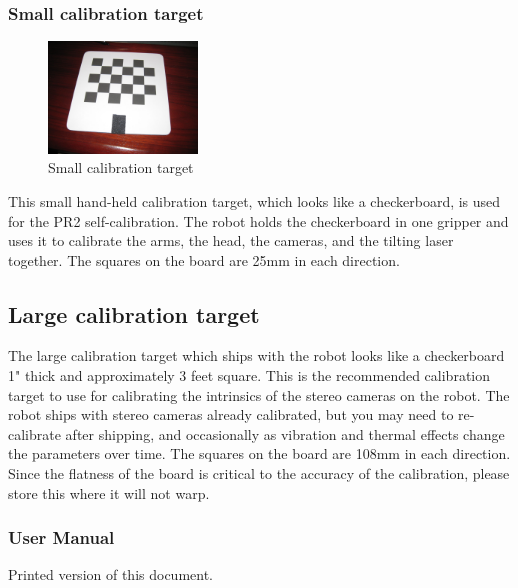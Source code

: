 \subsubsection{Small calibration target}
\begin{figure}[h!]
\centering
\includegraphics[width=150px]{images/hand_checkerboard.png}
\caption{Small calibration target}
\label{fig:hand_checkerboard}
\end{figure}
\label{hand_checkerboard}

This small hand-held calibration target, which looks
like a checkerboard, is used for the PR2 self-calibration.  The robot holds the
checkerboard in one gripper and uses it to calibrate the arms, the head, the
cameras, and the tilting laser together.  The squares on the board are 25mm in each direction.

\subsection{Large calibration target}
The large calibration target which ships with the robot looks like a
checkerboard 1" thick and approximately 3 feet square.  This is the
recommended calibration target to use for calibrating the intrinsics of the
stereo cameras on the robot.  The robot ships with stereo cameras already
calibrated, but you may need to re-calibrate after shipping, and occasionally as vibration and
thermal effects change the parameters over time.  The squares on the board are 108mm in each direction.
Since the flatness of the board is critical to the accuracy of the calibration, please store this where it will not warp.

\subsubsection{User Manual}
Printed version of this document.

